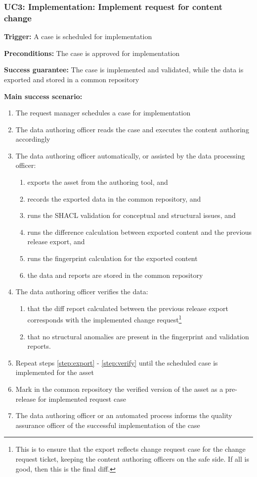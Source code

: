 	\subsubsection{UC3: Implementation: Implement request for content change}
	\label{sec:uc3}
	
	\textbf{Trigger:} A case is scheduled for implementation
	
	\textbf{Preconditions:} The case is approved for implementation
	
	\textbf{Success guarantee:} The case is implemented and validated, while the data is exported and stored in a common repository
	
	\textbf{Main success scenario:}
	
	\begin{enumerate}
		\item The request manager schedules a case for implementation
		\item The data authoring officer reads the case and executes the content authoring accordingly
		\item \label{step:export} The data authoring officer automatically, or assisted by the data processing officer:
		\begin{enumerate}
			\item exports the asset from the authoring tool, and
			\item records the exported data in the common repository, and 
			\item runs the SHACL validation for conceptual and structural issues, and
			\item runs the difference calculation between exported content and the previous release export, and
			\item runs the fingerprint calculation for the exported content
			\item the data and reports are stored in the common repository 
		\end{enumerate}		
		\item \label{step:verify} The data authoring officer verifies the data: 
		\begin{enumerate}
			\item that the diff report calculated between the previous release export corresponds with the implemented change request\footnote{This is to ensure that the export reflects change request case for the change request ticket, keeping the content authoring officers on the safe side. If all is good, then this is the final diff.}
			\item that no structural anomalies are present in the fingerprint and validation reports.
		\end{enumerate}		 
		\item Repeat steps \ref{step:export} - \ref{step:verify} until the scheduled case is implemented for the asset
		\item Mark in the common repository the verified version of the asset as a pre-release for implemented request case
		\item The data authoring officer or an automated process informs the quality assurance officer of the successful implementation of the case	
	\end{enumerate}
	
